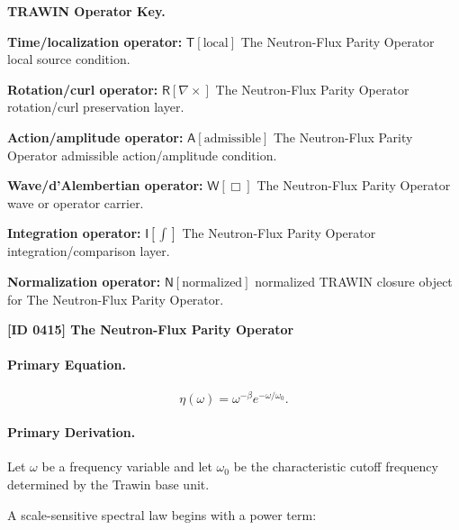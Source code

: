 \par\vspace{0.45\baselineskip}
\noindent\begin{minipage}[t]{\linewidth}
\begingroup
\small
\raggedright
\textbf{TRAWIN Operator Key.}\par
\noindent\textbf{Time/localization operator:} $\mathsf{T}\!\left[\mathrm{local}\right]$ The Neutron-Flux Parity Operator local source condition.\par
\noindent\textbf{Rotation/curl operator:} $\mathsf{R}\!\left[\nabla\times\right]$ The Neutron-Flux Parity Operator rotation/curl preservation layer.\par
\noindent\textbf{Action/amplitude operator:} $\mathsf{A}\!\left[\mathrm{admissible}\right]$ The Neutron-Flux Parity Operator admissible action/amplitude condition.\par
\noindent\textbf{Wave/d'Alembertian operator:} $\mathsf{W}\!\left[\Box\right]$ The Neutron-Flux Parity Operator wave or operator carrier.\par
\noindent\textbf{Integration operator:} $\mathsf{I}\!\left[\int\right]$ The Neutron-Flux Parity Operator integration/comparison layer.\par
\noindent\textbf{Normalization operator:} $\mathsf{N}\!\left[\mathrm{normalized}\right]$ normalized TRAWIN closure object for The Neutron-Flux Parity Operator.\par
\endgroup
\end{minipage}

\clearpage
\noindent\textbf{[ID 0415] The Neutron-Flux Parity Operator}\par
\vspace{0.35em}
\paragraph{Primary Equation.}
\begin{equation}
\eta(\omega)
=
\omega^{-\beta}
e^{-\omega/\omega_0}.
\end{equation}

\paragraph{Primary Derivation.}
Let $\omega$ be a frequency variable and let $\omega_0$ be the characteristic cutoff frequency determined by the Trawin base unit.

A scale-sensitive spectral law begins with a power term:

